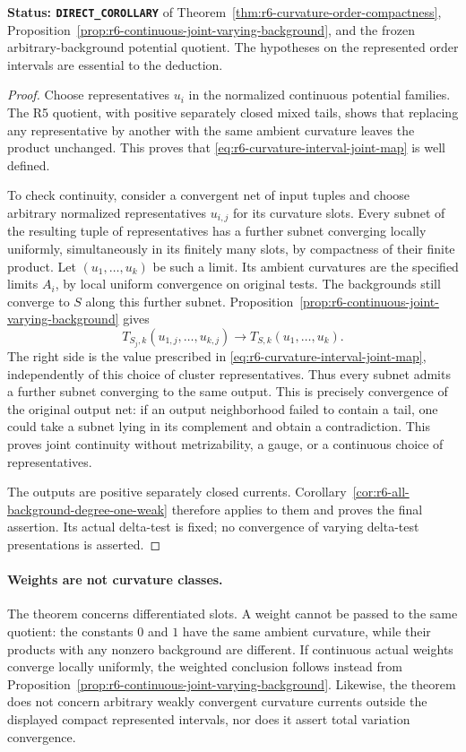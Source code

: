 \documentclass[11pt,a4paper]{article}
\numberwithin{equation}{section}
\theoremstyle{definition}
\theoremstyle{remark}
\begin{document}
\noindent\textbf{Status: \texttt{DIRECT\_COROLLARY}} of
Theorem~\ref{thm:r6-curvature-order-compactness},
Proposition~\ref{prop:r6-continuous-joint-varying-background}, and
the frozen arbitrary-background potential quotient. The hypotheses
on the represented order intervals are essential to the deduction.

\begin{proof}
Choose representatives $u_i$ in the normalized continuous potential
families. The R5 quotient, with positive separately closed mixed tails,
shows that replacing any representative by another with the same
ambient curvature leaves the product unchanged. This proves that
\eqref{eq:r6-curvature-interval-joint-map} is well defined.

To check continuity, consider a convergent net of input tuples and
choose arbitrary normalized representatives $u_{i,j}$ for its curvature
slots. Every subnet of the resulting tuple of representatives has a
further subnet converging locally uniformly, simultaneously in its
finitely many slots, by compactness of their finite product. Let
$(u_1,\ldots,u_k)$ be such a limit. Its ambient curvatures are the
specified limits $A_i$, by local uniform convergence on original tests.
The backgrounds still converge to $S$ along this further subnet.
Proposition~\ref{prop:r6-continuous-joint-varying-background} gives
\[
 T_{S_j,k}(u_{1,j},\ldots,u_{k,j})
                  \longrightarrow T_{S,k}(u_1,\ldots,u_k).
\]
The right side is the value prescribed in
\eqref{eq:r6-curvature-interval-joint-map}, independently of this
choice of cluster representatives. Thus every subnet admits a further
subnet converging to the same output. This is precisely convergence
of the original output net: if an output neighborhood failed to contain
a tail, one could take a subnet lying in its complement and obtain
a contradiction. This proves joint continuity without metrizability,
a gauge, or a continuous choice of representatives.

The outputs are positive separately closed currents.
Corollary~\ref{cor:r6-all-background-degree-one-weak} therefore applies
to them and proves the final assertion. Its actual delta-test is fixed;
no convergence of varying delta-test presentations is asserted.
\end{proof}

\paragraph{Weights are not curvature classes.}
The theorem concerns differentiated slots. A weight cannot be passed
to the same quotient: the constants $0$ and $1$ have the same ambient
curvature, while their products with any nonzero background are
different. If continuous actual weights converge locally uniformly,
the weighted conclusion follows instead from
Proposition~\ref{prop:r6-continuous-joint-varying-background}.
Likewise, the theorem does not concern arbitrary weakly convergent
curvature currents outside the displayed compact represented intervals,
nor does it assert total variation convergence.
\end{document}
